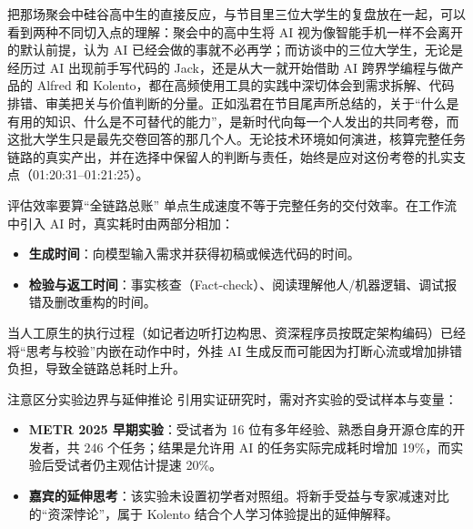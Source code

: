 \documentclass[UTF8,a4paper,11pt,fontset=fandol]{ctexart}
\begin{document}
把那场聚会中硅谷高中生的直接反应，与节目里三位大学生的复盘放在一起，可以看到两种不同切入点的理解：聚会中的高中生将 AI 视为像智能手机一样不会离开的默认前提，认为 AI 已经会做的事就不必再学；而访谈中的三位大学生，无论是经历过 AI 出现前手写代码的 Jack，还是从大一就开始借助 AI 跨界学编程与做产品的 Alfred 和 Kolento，都在高频使用工具的实践中深切体会到需求拆解、代码排错、审美把关与价值判断的分量。正如泓君在节目尾声所总结的，关于“什么是有用的知识、什么是不可替代的能力”，是新时代向每一个人发出的共同考卷，而这批大学生只是最先交卷回答的那几个人。无论技术环境如何演进，核算完整任务链路的真实产出，并在选择中保留人的判断与责任，始终是应对这份考卷的扎实支点（01:20:31–01:21:25）。

\begin{importantbox}{评估效率要算“全链路总账”}
单点生成速度不等于完整任务的交付效率。在工作流中引入 AI 时，真实耗时由两部分相加：
\begin{itemize}
\item \textbf{生成时间}：向模型输入需求并获得初稿或候选代码的时间。
\item \textbf{检验与返工时间}：事实核查（Fact-check）、阅读理解他人/机器逻辑、调试报错及删改重构的时间。
\end{itemize}
当人工原生的执行过程（如记者边听打边构思、资深程序员按既定架构编码）已经将“思考与校验”内嵌在动作中时，外挂 AI 生成反而可能因为打断心流或增加排错负担，导致全链路总耗时上升。
\end{importantbox}
\begin{warningbox}{注意区分实验边界与延伸推论}
引用实证研究时，需对齐实验的受试样本与变量：
\begin{itemize}
\item \textbf{METR 2025 早期实验}：受试者为 16 位有多年经验、熟悉自身开源仓库的开发者，共 246 个任务；结果是允许用 AI 的任务实际完成耗时增加 19\%，而实验后受试者仍主观估计提速 20\%。
\item \textbf{嘉宾的延伸思考}：该实验未设置初学者对照组。将新手受益与专家减速对比的“资深悖论”，属于 Kolento 结合个人学习体验提出的延伸解释。
\end{itemize}
\end{warningbox}
\end{document}
